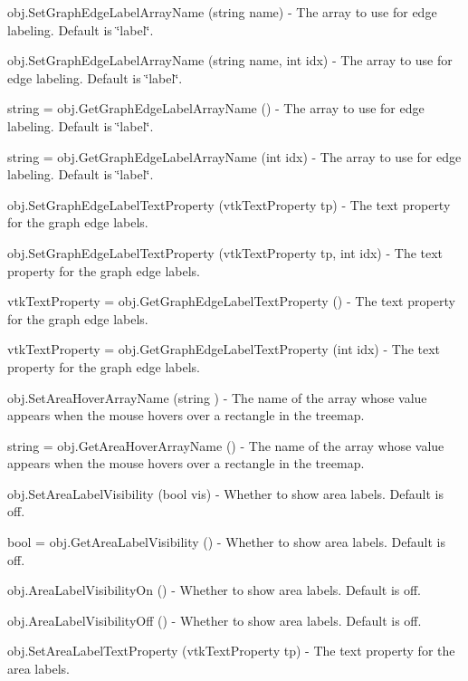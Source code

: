\begin{DoxyItemize}
\item {\ttfamily obj.\-Set\-Graph\-Edge\-Label\-Array\-Name (string name)} -\/ The array to use for edge labeling. Default is \char`\"{}label\char`\"{}.  
\item {\ttfamily obj.\-Set\-Graph\-Edge\-Label\-Array\-Name (string name, int idx)} -\/ The array to use for edge labeling. Default is \char`\"{}label\char`\"{}.  
\item {\ttfamily string = obj.\-Get\-Graph\-Edge\-Label\-Array\-Name ()} -\/ The array to use for edge labeling. Default is \char`\"{}label\char`\"{}.  
\item {\ttfamily string = obj.\-Get\-Graph\-Edge\-Label\-Array\-Name (int idx)} -\/ The array to use for edge labeling. Default is \char`\"{}label\char`\"{}.  
\item {\ttfamily obj.\-Set\-Graph\-Edge\-Label\-Text\-Property (vtk\-Text\-Property tp)} -\/ The text property for the graph edge labels.  
\item {\ttfamily obj.\-Set\-Graph\-Edge\-Label\-Text\-Property (vtk\-Text\-Property tp, int idx)} -\/ The text property for the graph edge labels.  
\item {\ttfamily vtk\-Text\-Property = obj.\-Get\-Graph\-Edge\-Label\-Text\-Property ()} -\/ The text property for the graph edge labels.  
\item {\ttfamily vtk\-Text\-Property = obj.\-Get\-Graph\-Edge\-Label\-Text\-Property (int idx)} -\/ The text property for the graph edge labels.  
\item {\ttfamily obj.\-Set\-Area\-Hover\-Array\-Name (string )} -\/ The name of the array whose value appears when the mouse hovers over a rectangle in the treemap.  
\item {\ttfamily string = obj.\-Get\-Area\-Hover\-Array\-Name ()} -\/ The name of the array whose value appears when the mouse hovers over a rectangle in the treemap.  
\item {\ttfamily obj.\-Set\-Area\-Label\-Visibility (bool vis)} -\/ Whether to show area labels. Default is off.  
\item {\ttfamily bool = obj.\-Get\-Area\-Label\-Visibility ()} -\/ Whether to show area labels. Default is off.  
\item {\ttfamily obj.\-Area\-Label\-Visibility\-On ()} -\/ Whether to show area labels. Default is off.  
\item {\ttfamily obj.\-Area\-Label\-Visibility\-Off ()} -\/ Whether to show area labels. Default is off.  
\item {\ttfamily obj.\-Set\-Area\-Label\-Text\-Property (vtk\-Text\-Property tp)} -\/ The text property for the area labels.  

\end{DoxyItemize}
